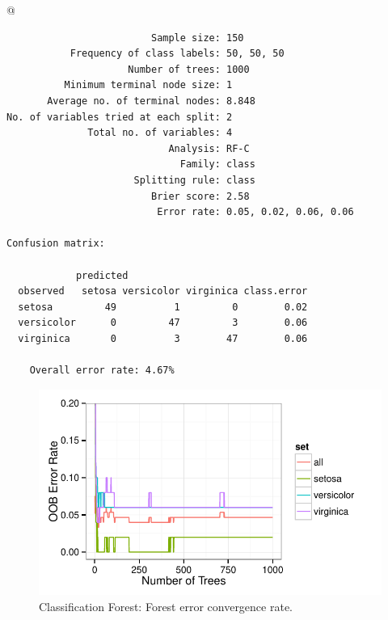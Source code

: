 \documentclass[nojss]{jss}\usepackage[]{graphicx}\usepackage[]{color}
\makeatletter
\def\maxwidth{ %
  \ifdim\Gin@nat@width>\linewidth
    \linewidth
  \else
    \Gin@nat@width
  \fi
}
\newenvironment{kframe}{%
 \def\at@end@of@kframe{}%
 \ifinner\ifhmode%
  \def\at@end@of@kframe{\end{minipage}}%
  \begin{minipage}{\columnwidth}%
 \fi\fi%
 \def\FrameCommand##1{\hskip\@totalleftmargin \hskip-\fboxsep
 \colorbox{shadecolor}{##1}\hskip-\fboxsep
     \hskip-\linewidth \hskip-\@totalleftmargin \hskip\columnwidth}%
 \MakeFramed {\advance\hsize-\width
   \@totalleftmargin\z@ \linewidth\hsize
   \@setminipage}}%
 {\par\unskip\endMakeFramed%
 \at@end@of@kframe}
\newenvironment{knitrout}{}{} %
\makeatother
\begin{document}
@


\begin{knitrout}\footnotesize
{}\color{fgcolor}\begin{kframe}
\begin{verbatim}
                         Sample size: 150
           Frequency of class labels: 50, 50, 50
                     Number of trees: 1000
          Minimum terminal node size: 1
       Average no. of terminal nodes: 8.848
No. of variables tried at each split: 2
              Total no. of variables: 4
                            Analysis: RF-C
                              Family: class
                      Splitting rule: class
                         Brier score: 2.58 
                          Error rate: 0.05, 0.02, 0.06, 0.06

Confusion matrix:

            predicted
  observed   setosa versicolor virginica class.error
  setosa         49          1         0        0.02
  versicolor      0         47         3        0.06
  virginica       0          3        47        0.06

	Overall error rate: 4.67% 
\end{verbatim}
\end{kframe}\begin{figure}[!htpb]


{\centering \includegraphics[width=\maxwidth]{figure/vig-iris-rf-error-1} 

}

\caption[Classification Forest]{Classification Forest: Forest error convergence rate.\label{fig:iris-rf-error}}
\end{figure}


\end{knitrout}
\end{document}
